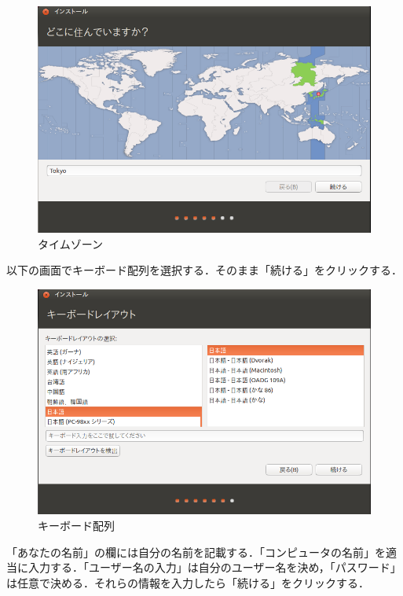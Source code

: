 \begin{figure}[H]
\centering
\includegraphics[width=15cm]{ubuntuinstall03.png}
\caption{タイムゾーン}\label{タイムゾーン}
\end{figure}


以下の画面でキーボード配列を選択する．そのまま「続ける」をクリックする．

\begin{figure}[H]
\centering
\includegraphics[width=15cm]{ubuntuinstall04.png}
\caption{キーボード配列}\label{キーボード配列}
\end{figure}


「あなたの名前」の欄には自分の名前を記載する．「コンピュータの名前」を適当に入力する．「ユーザー名の入力」は自分のユーザー名を決め，「パスワード」は任意で決める．それらの情報を入力したら「続ける」をクリックする．


